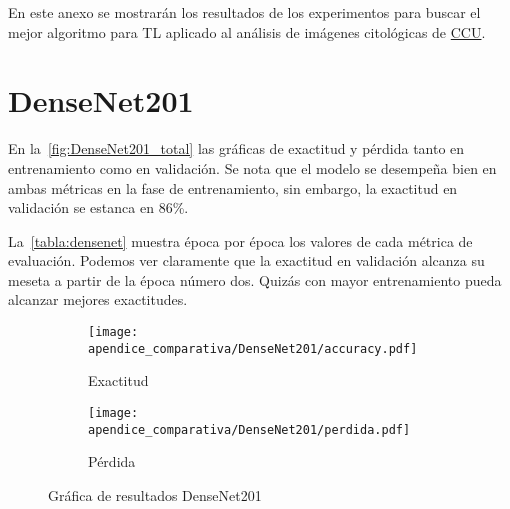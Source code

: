 
En este anexo se mostrarán los resultados de los experimentos para buscar el
mejor algoritmo para TL aplicado al análisis de imágenes citológicas de  \hyperlink{abbr}{CCU}. 

\section{DenseNet201}
En la~\autoref{fig:DenseNet201_total} las gráficas de exactitud y pérdida tanto
en entrenamiento como en validación. Se nota que el modelo se desempeña bien en
ambas métricas en la fase de entrenamiento, sin embargo, la exactitud en
validación se estanca en 86\%.

La~\autoref{tabla:densenet} muestra época por época los valores de cada métrica
de evaluación. Podemos ver claramente que la exactitud en validación alcanza su
meseta a partir de la época número dos. Quizás con mayor entrenamiento pueda
alcanzar mejores exactitudes.

\begin{figure}[H]
    \centering
    \begin{subfigure}[b]{0.8\textwidth}
        \centering
       \texttt{[image: apendice\_comparativa/DenseNet201/accuracy.pdf]}
       \caption{Exactitud}\label{fig:accuracy_dense} 
    \end{subfigure}

    \begin{subfigure}[b]{0.8\textwidth}
        \centering
       \texttt{[image: apendice\_comparativa/DenseNet201/perdida.pdf]}
       \caption{Pérdida}\label{fig:perdida_dense}
    \end{subfigure}
    \caption{Gráfica de resultados DenseNet201}\label{fig:DenseNet201_total}
\end{figure}

